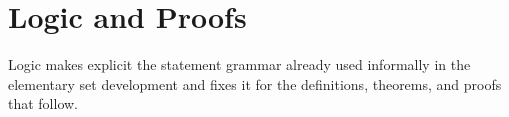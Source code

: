 \section{Logic and Proofs}

Logic makes explicit the statement grammar already used informally in the elementary set development and fixes it for the definitions, theorems, and proofs that follow.












